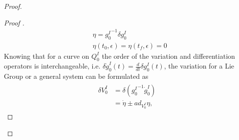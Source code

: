 \documentclass[lettersize,journal]{IEEEtran}
\begin{document}
\begin{proof}[Proof]
\begin{proof}[Proof ]
\begin{align}
  &\eta={g^I_0}^{-1}\delta g^I_0\\ &\eta(t_0,\epsilon)=\eta(t_f,\epsilon)=0
\end{align}
Knowing
that for a curve on $Q^I_0$ the order of the variation and differentiation operators is interchangeable, i.e. $\delta \dot{g}^I_0(t)=\frac{d}{dt}\delta g^I_0(t)$, the variation for a Lie Group or a general system can be formulated as
\begin{align}
  \begin{split}
    \delta V^I_0  &=\delta({g^I_0}^{-1}\dot{g}^I_0)\\
                  &=\dot{\eta}\pm ad_{V^I_0} \eta,
\end{split}
\end{align}


\end{proof}
\end{proof}
\end{document}
